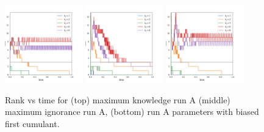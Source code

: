 \documentclass{jfm}
\begin{document}
\begin{figure}
    \centering
    \includegraphics[width=0.3\textwidth]{figs/rank_vs_t_run_A_max_knowl_kx_2.pdf}
    \includegraphics[width=0.3\textwidth]{figs/rank_vs_t_run_A_DSS_max_ig_kx_2.pdf}
    \includegraphics[width=0.3\textwidth]{figs/rank_vs_t_run_I_kx_2.pdf}
    \caption{Rank vs time for (top) maximum knowledge run A (middle) maximum ignorance run A, (bottom) run A parameters with biased first cumulant.}
    \label{fig:rank_run_A_max_knowl}
\end{figure}


\end{document}

